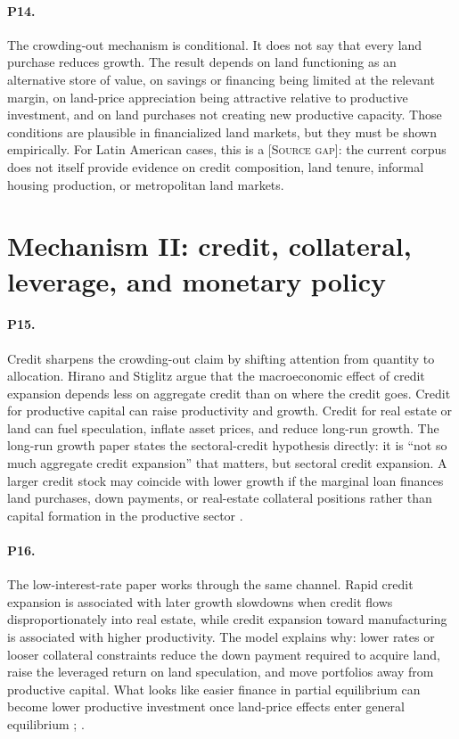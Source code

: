 \documentclass[11pt]{article}
\newcommand{\sourcegap}{\textsc{[Source gap]}}
\begin{document}
\paragraph{P14.} The crowding-out mechanism is conditional. It does not say that every land purchase reduces growth. The result depends on land functioning as an alternative store of value, on savings or financing being limited at the relevant margin, on land-price appreciation being attractive relative to productive investment, and on land purchases not creating new productive capacity. Those conditions are plausible in financialized land markets, but they must be shown empirically. For Latin American cases, this is a \sourcegap{}: the current corpus does not itself provide evidence on credit composition, land tenure, informal housing production, or metropolitan land markets.

\section{Mechanism II: credit, collateral, leverage, and monetary policy}

\paragraph{P15.} Credit sharpens the crowding-out claim by shifting attention from quantity to allocation. Hirano and Stiglitz argue that the macroeconomic effect of credit expansion depends less on aggregate credit than on where the credit goes. Credit for productive capital can raise productivity and growth. Credit for real estate or land can fuel speculation, inflate asset prices, and reduce long-run growth. The long-run growth paper states the sectoral-credit hypothesis directly: it is ``not so much aggregate credit expansion'' that matters, but sectoral credit expansion. A larger credit stock may coincide with lower growth if the marginal loan finances land purchases, down payments, or real-estate collateral positions rather than capital formation in the productive sector \citep[pp.~1, 15, 33, 38]{hiranoStiglitz2024CreditLandGrowth}.

\paragraph{P16.} The low-interest-rate paper works through the same channel. Rapid credit expansion is associated with later growth slowdowns when credit flows disproportionately into real estate, while credit expansion toward manufacturing is associated with higher productivity. The model explains why: lower rates or looser collateral constraints reduce the down payment required to acquire land, raise the leveraged return on land speculation, and move portfolios away from productive capital. What looks like easier finance in partial equilibrium can become lower productive investment once land-price effects enter general equilibrium \citep[p.~1]{hiranoStiglitz2025LowInterestPolicy}; \citep[pp.~1, 15, 33, 38]{hiranoStiglitz2024CreditLandGrowth}.
\end{document}
